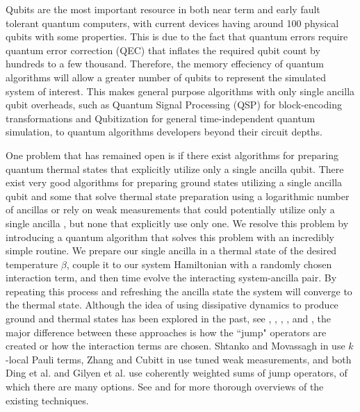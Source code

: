 \documentclass{article}
\begin{document}
Qubits are the most important resource in both near term and early fault tolerant quantum computers, with current devices having around 100 physical qubits with some properties. This is due to the fact that quantum errors require quantum error correction (QEC) that inflates the required qubit count by hundreds to a few thousand. Therefore, the memory effeciency of quantum algorithms will allow a greater number of qubits to represent the simulated system of interest. This makes general purpose algorithms with only single ancilla qubit overheads, such as Quantum Signal Processing (QSP) for block-encoding transformations and Qubitization for general time-independent quantum simulation, to quantum algorithms developers beyond their circuit depths. 



One problem that has remained open is if there exist algorithms for preparing quantum thermal states that explicitly utilize only a single ancilla qubit. There exist very good algorithms for preparing ground states utilizing a single ancilla qubit \cite{ding2024single} and some that solve thermal state preparation using a logarithmic number of ancillas \cite{chen_fast_2022} or rely on weak measurements that could potentially utilize only a single ancilla \cite{zhang2023dissipative}, but none that explicitly use only one. We resolve this problem by introducing a quantum algorithm that solves this problem with an incredibly simple routine. We prepare our single ancilla in a thermal state of the desired temperature $\beta$, couple it to our system Hamiltonian with a randomly chosen interaction term, and then time evolve the interacting system-ancilla pair. By repeating this process and refreshing the ancilla state the system will converge to the thermal state. Although the idea of using dissipative dynamics to produce ground and thermal states has been explored in the past, see \cite{shtanko2023preparingthermalstatesnoiseless}, \cite{cubitt2023dissipativegroundstatepreparation}, \cite{zhang2023dissipative}, \cite{ding2024single}, and \cite{gilyen2024quantumgeneralizationsglaubermetropolis}, the major difference between these approaches is how the ``jump" operators are created or how the interaction terms are chosen. Shtanko and Movassagh in \cite{shtanko2023preparingthermalstatesnoiseless} use $k$-local Pauli terms, Zhang and Cubitt in \cite{zhang2023dissipative} use tuned weak measurements, and both Ding et al. \cite{ding2024single} and Gilyen et al. \cite{gilyen2024quantumgeneralizationsglaubermetropolis} use coherently weighted sums of jump operators, of which there are many options. See \cite{dalzell2023quantumalgorithmssurveyapplications} and \cite{chen2023quantumthermalstatepreparation} for more thorough overviews of the existing techniques.
\end{document}
